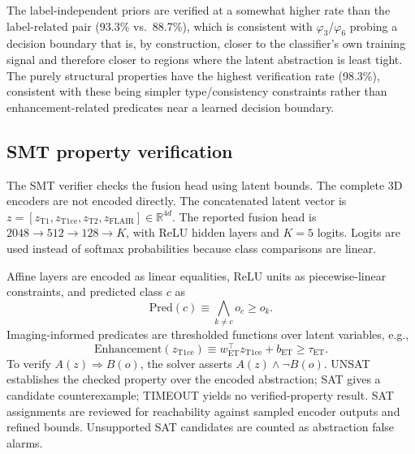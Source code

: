 \documentclass[preprint,11pt]{elsarticle}
\newcommand{\R}{\mathbb{R}}
\begin{document}
The label-independent priors are verified at a somewhat higher rate than the label-related pair (93.3\% vs.\ 88.7\%), which is consistent with $\varphi_3$/$\varphi_6$ probing a decision boundary that is, by construction, closer to the classifier's own training signal and therefore closer to regions where the latent abstraction is least tight. The purely structural properties have the highest verification rate (98.3\%), consistent with these being simpler type/consistency constraints rather than enhancement-related predicates near a learned decision boundary.

\subsection{SMT property verification}
\label{subsec:smt_encoding}

The SMT verifier checks the fusion head using latent bounds. The complete 3D encoders are not encoded directly. The concatenated latent vector is $z=[z_{\mathrm{T1}},z_{\mathrm{T1ce}},z_{\mathrm{T2}},z_{\mathrm{FLAIR}}]\in\R^{4d}$. The reported fusion head is $2048\rightarrow512\rightarrow128\rightarrow K$, with ReLU hidden layers and $K=5$ logits. Logits are used instead of softmax probabilities because class comparisons are linear.

Affine layers are encoded as linear equalities, ReLU units as piecewise-linear constraints, and predicted class $c$ as
\begin{equation}
\mathrm{Pred}(c)\equiv\bigwedge_{k\neq c} o_c\geq o_k.
\end{equation}
Imaging-informed predicates are thresholded functions over latent variables, e.g.,
\begin{equation}
\mathrm{Enhancement}(z_{\mathrm{T1ce}})\equiv w_{\mathrm{ET}}^\top z_{\mathrm{T1ce}}+b_{\mathrm{ET}}\geq\tau_{\mathrm{ET}}.
\end{equation}
To verify $A(z)\Rightarrow B(o)$, the solver asserts $A(z)\wedge\neg B(o)$. UNSAT establishes the checked property over the encoded abstraction; SAT gives a candidate counterexample; TIMEOUT yields no verified-property result. SAT assignments are reviewed for reachability against sampled encoder outputs and refined bounds. Unsupported SAT candidates are counted as abstraction false alarms.
\end{document}

